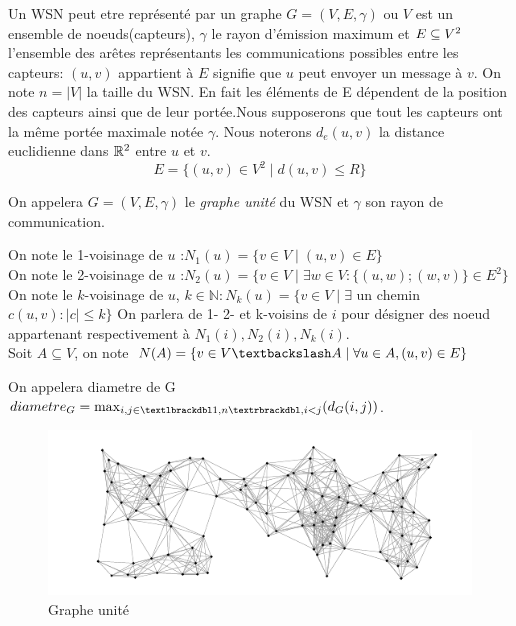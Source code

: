   Un WSN peut etre représenté par un graphe $G= (V,E,\gamma)$ ou $V$ est un ensemble de noeuds(capteurs), $\gamma$ le rayon d'émission maximum et $E \subseteq V \textsuperscript{2}$ l'ensemble des arêtes représentants les communications
 possibles entre les capteurs: $(u,v)$ appartient à $E$ signifie que $u$ peut envoyer un  message à $v$. On note $ n=|V| $ la taille du WSN. En fait les éléments de E dépendent de la position des capteurs ainsi que de leur portée.Nous 
supposerons que tout les capteurs ont la même portée maximale notée $\gamma$. Nous noterons $d_e(u,v)$ la distance euclidienne dans $\mathbb{R} \textsuperscript{2}$ entre $u$ et $v$.
$$E = \{ (u,v) \in V ^{2} \mid d(u,v) \leq R \}$$

\begin{mydef}
 On appelera $G= (V,E,\gamma)$ le \textit{graphe unité} du WSN et $\gamma$ son rayon de communication.
\end{mydef}

\begin{mydef}
On note le 1-voisinage de $u$ :$N_1(u) = \{ v \in V  \mid (u,v) \in E \}$ \\
On note le 2-voisinage de $u$ :$N_2(u) = \{ v \in V \mid  \exists w \in V :\{(u,w);(w,v)\} \in E ^2\}$ \\
On note le $k$-voisinage de $u$, $k \in \mathbb{N} : N_k(u) = \{ v \in V  \mid \exists $ un chemin $c (u,v): |c| \leq k\}$  On parlera de 1- 2- et k-voisins de $i$ pour désigner des noeud appartenant respectivement à $N_1(i),
N_2(i),N_k(i)$. \\
Soit $A \subseteq V$, on note $N(A) = \{ v \in V\textbackslash  A \mid \forall u\in A,(u,v) \in E \}$ \\
\end{mydef}

\begin{mydef}
 On appelera diametre de G $diametre_G=\max_{i,j\in \textlbrackdbl 1,n \textrbrackdbl,i<j}(d_G(i,j))$.
\end{mydef}
 
\begin{figure}[H]
\centering
\includegraphics[scale=0.5]{Etat_de_l'art/source/graph1.png}
\caption{Graphe unité}
\end{figure} 


